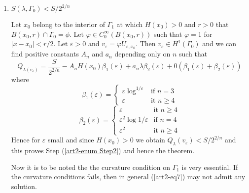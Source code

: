 \begin{sketchoftheproof}
\begin{enumerate}[\rm \bf Step 1.]
\item $S(\lambda, \Gamma_{0}) < S/2^{2/n}$\label{art2-enum Step2}

Let $x_{0}$ belong to the interior of $\Gamma_{1}$ at which $H(x_{0}) > 0 $ and $r > 0$ that $B(x_{0}, r) \cap \Gamma_{0} = \phi$. Let $\varphi \in C_{0}^{\infty}(B(x_{0}, r))$ such that $\varphi = 1$ for $|x-x_{0}| < r/2$. Let $\varepsilon > 0$ and $v_{\varepsilon}  = \varphi U_{\varepsilon, x_{0}}$. Then $v_{\varepsilon} \in H^{1}(\Gamma_{0})$ and we can find positive constants $A_{n}$ and $a_{n}$ depending only on $n$ such that      
\begin{equation}
Q_{\lambda(v_{\varepsilon})} = \dfrac{S}{2^{2/n}} -A_{n}H(x_{0})\beta_{1}(\varepsilon) + a_{n}\lambda \beta_{2}(\varepsilon) + 0(\beta_{1}(\varepsilon) + \beta_{2}(\varepsilon))\label{art2-eq10}
\end{equation}
where
\begin{equation*}
\beta_{1}(\varepsilon) = 
\begin{cases}
\varepsilon \log^{1/\varepsilon} & \text{if $n =3$}\\
\varepsilon & \text{it $n\geq 4$}
\end{cases}
\end{equation*}
\begin{equation*}
\beta_{2}(\varepsilon) = 
\begin{cases}
\varepsilon & \text{it $n\geq 4$}\\
\varepsilon^{2} \log{1/\varepsilon} & \text{if $n =4$}\\
\varepsilon^{2} & \text{it $n\geq 4$}
\end{cases}
\end{equation*}
Hence for $\varepsilon$ small and since $H(x_{0}) > 0$ we obtain $Q_{\lambda}(v_{\varepsilon}) < S/2^{2/n}$ and this proves Step (\ref{art2-enum Step2}) and hence the theorem.

Now it is to be noted the the curvature condition on $\Gamma_{1}$ is very essential. If the curvature conditions fails, then in general (\ref{art2-eq7}) may not admit any solution.


\end{enumerate}
\end{sketchoftheproof}
